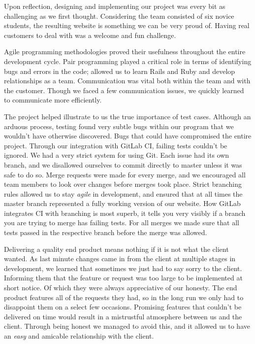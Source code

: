 \documentclass{l3proj}
\begin{document}
Upon reflection, designing and implementing our project was every bit as challenging as we first thought. Considering the team consisted of six novice students, the resulting website is something we can be very proud of. Having real customers to deal with was a welcome and fun challenge.

Agile programming methodologies proved their usefulness throughout the entire development cycle. Pair programming played a critical role in terms of identifying bugs and errors in the code; allowed us to learn Rails and Ruby and develop relationships as a team. Communication was vital both within the team and with the customer. Though we faced a few communication issues, we quickly learned to communicate more efficiently.


The project helped illustrate to us the true importance of test cases. Although an arduous process, testing found very subtle bugs within our program that we wouldn't have otherwise discovered. Bugs that could have compromised the entire project. Through our integration with GitLab CI, failing tests couldn't be ignored. We had a very strict system for using Git. Each issue had its own branch, and we disallowed ourselves to commit directly to master unless it was safe to do so. Merge requests were made for every merge, and we encouraged all team members to look over changes before merges took place. Strict branching rules allowed us to stay \textit{agile} in development, and ensured that at all times the master branch represented a fully working version of our website. How GitLab integrates CI with branching is most superb, it tells you very visibly if a branch you are trying to merge has failing tests. For all merges we made sure that all tests passed in the respective branch before the merge was allowed.

Delivering a quality end product means nothing if it is not what the client wanted. As last minute changes came in from the client at multiple stages in development, we learned that sometimes we just had to say sorry to the client. Informing them that the feature or request was too large to be implemented at short notice. Of which they were always appreciative of our honesty. The end product features all of the requests they had, so in the long run we only had to disappoint them on a select few occasions. Promising features that couldn't be delivered on time would result in a mistrustful atmosphere between us and the client. Through being honest we managed to avoid this, and it allowed us to have an \textit{easy} and amicable relationship with the client.
\end{document}

